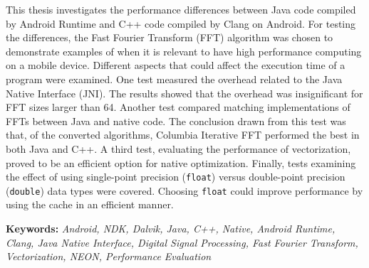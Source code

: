 This thesis investigates the performance differences between Java code compiled by Android Runtime and C++ code compiled by Clang on Android. For testing the differences, the Fast Fourier Transform (FFT) algorithm was chosen to demonstrate examples of when it is relevant to have high performance computing on a mobile device. Different aspects that could affect the execution time of a program were examined. One test measured the overhead related to the Java Native Interface (JNI). The results showed that the overhead was insignificant for FFT sizes larger than 64. Another test compared matching implementations of FFTs between Java and native code. The conclusion drawn from this test was that, of the converted algorithms, Columbia Iterative FFT performed the best in both Java and C++. A third test, evaluating the performance of vectorization, proved to be an efficient option for native optimization. Finally, tests examining the effect of using single-point precision (\texttt{float}) versus double-point precision (\texttt{double}) data types were covered. Choosing \texttt{float} could improve performance by using the cache in an efficient manner.

\textbf{Keywords:} \emph{Android, NDK, Dalvik, Java, C++, Native, Android Runtime, Clang, Java Native Interface, Digital Signal Processing, Fast Fourier Transform, Vectorization, NEON, Performance Evaluation}
